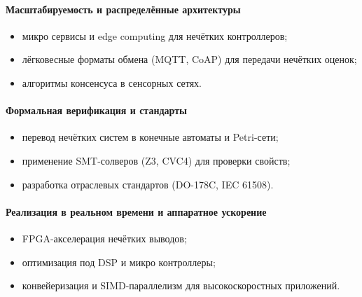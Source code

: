 \paragraph{Масштабируемость и распределённые архитектуры}
\begin{itemize}
  \item микро сервисы и edge computing для нечётких контроллеров;
  \item лёгковесные форматы обмена (MQTT, CoAP) для передачи нечётких оценок;
  \item алгоритмы консенсуса в сенсорных сетях.
\end{itemize}

\paragraph{Формальная верификация и стандарты}
\begin{itemize}
  \item перевод нечётких систем в конечные автоматы и Petri-сети;
  \item применение SMT-солверов (Z3, CVC4) для проверки свойств;
  \item разработка отраслевых стандартов (DO-178C, IEC 61508).
\end{itemize}

\paragraph{Реализация в реальном времени и аппаратное ускорение}
\begin{itemize}
  \item FPGA-акселерация нечётких выводов;
  \item оптимизация под DSP и микро контроллеры;
  \item конвейеризация и SIMD-параллелизм для высокоскоростных приложений.
\end{itemize}

